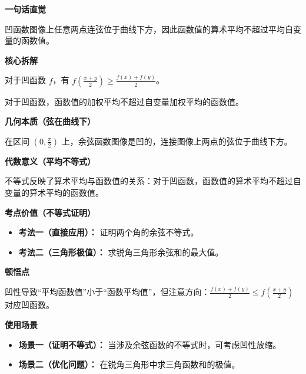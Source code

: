 \begin{explanationbox}
\textbf{\textcolor{CExplanation}{一句话直觉}}

凹函数图像上任意两点连弦位于曲线下方，因此函数值的算术平均不超过平均自变量的函数值。

\medskip
\textbf{\textcolor{CExplanation}{核心拆解}}
\begin{description}[style=nextline, leftmargin=2.8em, labelsep=0.5em, itemsep=0.45em]
    \item[\textbf{要点一（凹函数定义）：}] 对于凹函数 $f$，有 $f\left(\frac{x+y}{2}\right) \geq \frac{f(x)+f(y)}{2}$。
    \item[\textbf{要点二（Jensen不等式）：}] 对于凹函数，函数值的加权平均不超过自变量加权平均的函数值。
\end{description}

\medskip
\textbf{\textcolor{CExplanation}{几何本质（弦在曲线下）}}

在区间 $(0,\frac{\pi}{2})$ 上，余弦函数图像是凹的，连接图像上两点的弦位于曲线下方。

\medskip
\textbf{\textcolor{CExplanation}{代数意义（平均不等式）}}

不等式反映了算术平均与函数值的关系：对于凹函数，函数值的算术平均不超过自变量的算术平均的函数值。

\medskip
\textbf{\textcolor{CExplanation}{考点价值（不等式证明）}}
\begin{itemize}[leftmargin=*, itemsep=0.5em, topsep=0.4em]
    \item \textbf{考法一（直接应用）：} 证明两个角的余弦不等式。
    \item \textbf{考法二（三角形极值）：} 求锐角三角形余弦和的最大值。
\end{itemize}

\medskip
\textbf{\textcolor{CExplanation}{顿悟点}}

凹性导致“平均函数值”小于“函数平均值”，但注意方向：$\frac{f(x)+f(y)}{2} \leq f\left(\frac{x+y}{2}\right)$ 对应凹函数。

\medskip
\textbf{\textcolor{CExplanation}{使用场景}}
\begin{itemize}[leftmargin=*, itemsep=0.5em, topsep=0.4em]
    \item \textbf{场景一（证明不等式）：} 当涉及余弦函数的不等式时，可考虑凹性放缩。
    \item \textbf{场景二（优化问题）：} 在锐角三角形中求三角函数和的极值。
\end{itemize}
\end{explanationbox}
